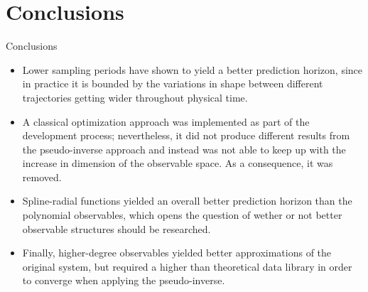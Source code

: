 \documentclass{beamer}
\begin{document}
\section{Conclusions}

\begin{frame}{Conclusions}
    \begin{itemize}
        \item Lower sampling periods have shown to yield a better prediction horizon, since in practice it is bounded by the variations in shape between different trajectories getting wider throughout physical time.
        \item A classical optimization approach was implemented as part of the development process; nevertheless, it did not produce different results from the pseudo-inverse approach and instead was not able to keep up with the increase in dimension of the observable space. As a consequence, it was removed.
        \item Spline-radial functions yielded an overall better prediction horizon than the polynomial observables, which opens the question of wether or not better observable structures should be researched.
        \item Finally, higher-degree observables yielded better approximations of the original system, but required a higher than theoretical data library in order to converge when applying the pseudo-inverse.
    \end{itemize}
\end{frame}
\end{document}
